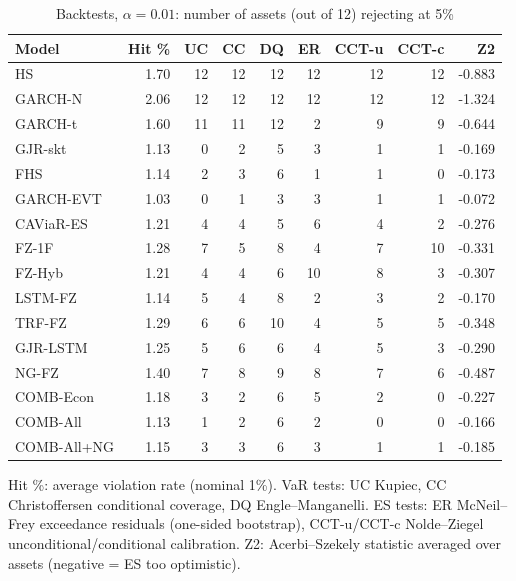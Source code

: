 \begin{table}[htbp]
\centering
\footnotesize
\caption{Backtests, $\alpha=0.01$: number of assets (out of 12) rejecting at 5\%}
\label{tab:bt_a010}
\begin{tabular}{lrrrrrrrr}
\toprule
Model & Hit \% & UC & CC & DQ & ER & CCT-u & CCT-c & Z2 \\
\midrule
HS & 1.70 & 12 & 12 & 12 & 12 & 12 & 12 & -0.883 \\
GARCH-N & 2.06 & 12 & 12 & 12 & 12 & 12 & 12 & -1.324 \\
GARCH-t & 1.60 & 11 & 11 & 12 & 2 & 9 & 9 & -0.644 \\
GJR-skt & 1.13 & 0 & 2 & 5 & 3 & 1 & 1 & -0.169 \\
FHS & 1.14 & 2 & 3 & 6 & 1 & 1 & 0 & -0.173 \\
GARCH-EVT & 1.03 & 0 & 1 & 3 & 3 & 1 & 1 & -0.072 \\
CAViaR-ES & 1.21 & 4 & 4 & 5 & 6 & 4 & 2 & -0.276 \\
FZ-1F & 1.28 & 7 & 5 & 8 & 4 & 7 & 10 & -0.331 \\
FZ-Hyb & 1.21 & 4 & 4 & 6 & 10 & 8 & 3 & -0.307 \\
LSTM-FZ & 1.14 & 5 & 4 & 8 & 2 & 3 & 2 & -0.170 \\
TRF-FZ & 1.29 & 6 & 6 & 10 & 4 & 5 & 5 & -0.348 \\
GJR-LSTM & 1.25 & 5 & 6 & 6 & 4 & 5 & 3 & -0.290 \\
NG-FZ & 1.40 & 7 & 8 & 9 & 8 & 7 & 6 & -0.487 \\
COMB-Econ & 1.18 & 3 & 2 & 6 & 5 & 2 & 0 & -0.227 \\
COMB-All & 1.13 & 1 & 2 & 6 & 2 & 0 & 0 & -0.166 \\
COMB-All+NG & 1.15 & 3 & 3 & 6 & 3 & 1 & 1 & -0.185 \\
\bottomrule
\end{tabular}
\par\smallskip\parbox{\linewidth}{\scriptsize Hit \%: average violation rate (nominal 1\%). VaR tests: UC Kupiec, CC Christoffersen conditional coverage, DQ Engle--Manganelli. ES tests: ER McNeil--Frey exceedance residuals (one-sided bootstrap), CCT-u/CCT-c Nolde--Ziegel unconditional/conditional calibration. Z2: Acerbi--Szekely statistic averaged over assets (negative = ES too optimistic).}
\end{table}